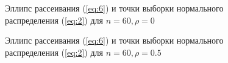 \documentclass{article}
\begin{document}
\newpage
\begin{figure}[h]
\caption{Эллипс рассеивания (\ref{eq:6}) и точки выборки нормального распределения (\ref{eq:2}) для $n = 60, \rho = 0$}
\end{figure}

\begin{figure}[h]
\caption{Эллипс рассеивания (\ref{eq:6}) и точки выборки нормального распределения (\ref{eq:2}) для $n = 60, \rho = 0.5$}
\end{figure}
\end{document}
